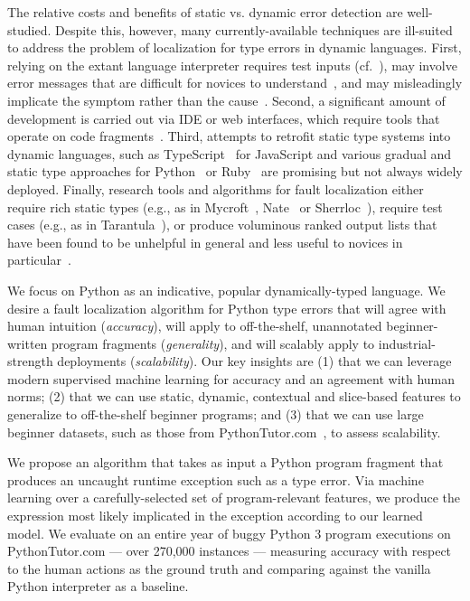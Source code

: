 \documentclass[conference]{IEEEtran}
\begin{document}
The relative costs and benefits of static vs. dynamic error detection are
well-studied. Despite this, however, many currently-available techniques
are ill-suited to address the problem of localization for type errors in
dynamic languages. First, relying on the extant language interpreter
requires test inputs
(cf.~\cite{Godefroid2005-am,Naylor2007-mi,Cadar2008-kg,PAcheco2007-at}),
may involve error messages that are difficult for novices to
understand~\cite{Marceau2011-ok,Marceau2011-cy,Nienaltowski2008-bv,Jadud2006-ly,Ishii2014-nf},
and may misleadingly implicate the symptom rather than the
cause~\cite{zeller05,Jose2011}.  Second, a
significant amount of development is carried out via IDE or web interfaces,
which require tools that operate on code fragments~\cite{Guo2013-vu}.
Third, attempts to retrofit static type systems into dynamic languages,
such as TypeScript~\cite{typescript2014,refscriptpldi16,mollerOOPSLA14} for
JavaScript and various
gradual and static type approaches for 
Python~\cite{mypy,gradual-typing-python} or
Ruby~\cite{static-typing-ruby,an11,foster09,foster11}
are promising but not always widely
deployed. Finally, research tools and algorithms for fault
localization either require rich static types (e.g., as in
Mycroft~\cite{FIXME}, Nate~\cite{learning-to-blame} or Sherrloc~\cite{FIXME}), require
test cases (e.g., as in Tarantula~\cite{tarantula}), or produce voluminous
ranked output lists that have been found to be unhelpful in general and
less useful to novices in particular~\cite[Sec.~5.1]{orso-parnin}.

We focus on Python as an indicative, popular dynamically-typed language.
We desire a fault localization algorithm for Python type errors that
will agree with human intuition (\emph{accuracy}), will apply to
off-the-shelf, unannotated beginner-written program fragments
(\emph{generality}), and will scalably apply to industrial-strength
deployments (\emph{scalability}). Our key insights are (1) that we can leverage
modern supervised machine learning for accuracy and an agreement with human
norms; (2) that we can use static, dynamic, contextual and slice-based
features to generalize to off-the-shelf beginner programs; and (3) that we
can use large beginner datasets, such as those from
PythonTutor.com~\cite{Guo2013-vu}, to assess scalability.

We propose an algorithm that takes as input a Python program fragment that
produces an uncaught runtime exception such as a type error. Via machine
learning over a carefully-selected set of program-relevant features, we
produce the expression most likely implicated in the exception according to
our learned model. We evaluate on an entire year of buggy Python 3 program
executions on PythonTutor.com --- over 270,000 instances --- measuring
accuracy with respect to the human actions as the ground truth and
comparing against the vanilla Python interpreter as a baseline.
\end{document}
